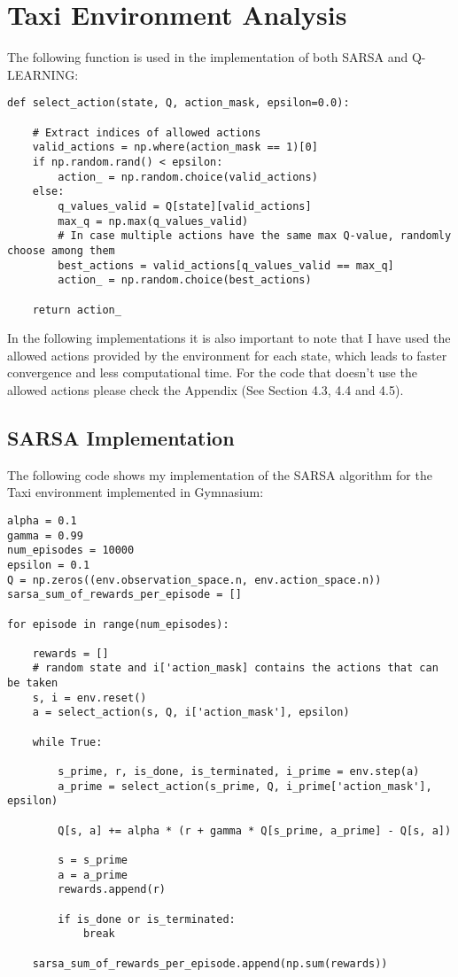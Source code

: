 \documentclass[11pt,a4paper]{article}
\begin{document}
\section{Taxi Environment Analysis}

The following function is used in the implementation of both SARSA and Q-LEARNING: \\

\begin{lstlisting}
def select_action(state, Q, action_mask, epsilon=0.0):

    # Extract indices of allowed actions
    valid_actions = np.where(action_mask == 1)[0]
    if np.random.rand() < epsilon:
        action_ = np.random.choice(valid_actions)
    else:
        q_values_valid = Q[state][valid_actions]
        max_q = np.max(q_values_valid)
        # In case multiple actions have the same max Q-value, randomly choose among them
        best_actions = valid_actions[q_values_valid == max_q]
        action_ = np.random.choice(best_actions)

    return action_
\end{lstlisting}

\vline

\noindent In the following implementations it is also important to note that I have used the allowed actions provided by the environment for each state, which leads to faster convergence and less computational time. For the code that doesn't use the allowed actions please check the Appendix (See Section 4.3, 4.4 and 4.5).

\subsection{SARSA Implementation}

The following code shows my implementation of the SARSA algorithm for the Taxi environment implemented in Gymnasium: \\

\begin{lstlisting}
alpha = 0.1
gamma = 0.99
num_episodes = 10000
epsilon = 0.1
Q = np.zeros((env.observation_space.n, env.action_space.n))
sarsa_sum_of_rewards_per_episode = []

for episode in range(num_episodes):

    rewards = []
    # random state and i['action_mask] contains the actions that can be taken
    s, i = env.reset()
    a = select_action(s, Q, i['action_mask'], epsilon)

    while True:

        s_prime, r, is_done, is_terminated, i_prime = env.step(a)
        a_prime = select_action(s_prime, Q, i_prime['action_mask'], epsilon)
        
        Q[s, a] += alpha * (r + gamma * Q[s_prime, a_prime] - Q[s, a])

        s = s_prime
        a = a_prime
        rewards.append(r)

        if is_done or is_terminated:
            break
    
    sarsa_sum_of_rewards_per_episode.append(np.sum(rewards))
\end{lstlisting}
\end{document}
